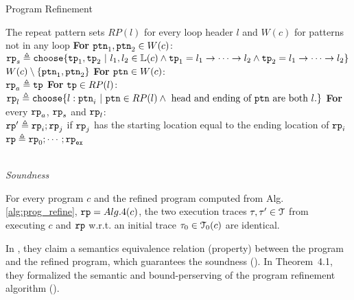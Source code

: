 \begin{algorithm}
\caption{
{Program Refinement}
\label{alg:prog_refine}
}
\begin{algorithmic}[1]
\REQUIRE The repeat pattern sets $RP(l)$ for every loop header $l$ and $W(c)$ for patterns not in any loop
\STATE  \textbf{For} $\mathtt{ptn}_1, \mathtt{ptn}_2 \in W(c)$:
\\ \quad 
$\rprog_{s} \triangleq 
  \rpchoose{
  \tpath_1, \tpath_2 ~|~ l_1, l_2 \in \lvar(c) \land 
  \tpath_1 = l_1 \to \cdots \to l_2 \land \tpath_2 = l_1 \to \cdots \to l_2
  }
$
\\ \quad 
$ W(c) \setminus \{\mathtt{ptn}_1, \mathtt{ptn}_2\} $
\STATE  \textbf{For} $\mathtt{ptn}\in W(c)$:
\\ \quad 
$\mathtt{rp}_{a} \triangleq  \mathtt{tp}$
\STATE \textbf{For} $\mathtt{tp} \in RP(l)$:
\\ \quad
$\rprog_l \triangleq 
\rpchoose{
 l: \rpattern_{i} ~|~ \rpattern \in RP(l) \land \text{ head and ending of } \rpattern \text{ are both } l.
}$
\STATE \textbf{For} every $\mathtt{rp}_a$, $\mathtt{rp}_{s}$ and $\mathtt{rp}_l$:
\\ \quad
$\mathtt{rp}' \triangleq \mathtt{rp}_i; \mathtt{rp}_{j}$
 if $\mathtt{rp}_{j}$ has the starting location equal to the ending location of $\mathtt{rp}_i$
\RETURN $\mathtt{rp} \triangleq \mathtt{rp}_0; \cdots; \mathtt{rp}_{\mathtt{ex}}$
\end{algorithmic}
\end{algorithm}
%

\\
\emph{Soundness}
\begin{thm}
  \label{thm:sound_refined-prog}
  For every program $c$ and the refined program computed from Alg.\ref{alg:prog_refine}, $\mathtt{rp} = Alg.4(c)$,
  the two execution traces $\mathtt{\tau}, \mathtt{\tau}' \in \mathcal{T}$
  from executing $c$ and $\mathtt{rp}$ w.r.t. an initial trace $\mathtt{\tau}_0 \in \mathcal{T}_0(c)$ are identical.
\end{thm}
In \cite{GulwaniJK09}, they claim a semantics equivalence relation (property)
between the program and the refined program, which guarantees the soundness ().
%
In Theorem~4.1, they formalized the semantic and bound-perserving of the program refinement algorithm
().
